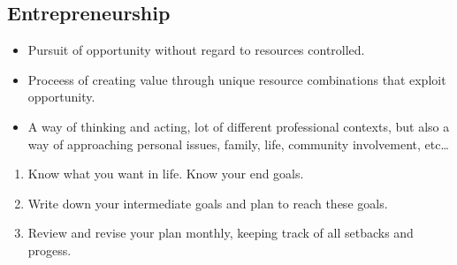 \subsection{Entrepreneurship}

\begin{definition}[Entrepreneurship]

    \begin{itemize}
        \item Pursuit of opportunity without regard to resources controlled.
        \item Proceess of creating value through unique resource combinations
            that exploit opportunity.
        \item A way of thinking and acting, lot of different professional
            contexts, but also a way of approaching personal issues, family,
            life, community involvement, etc\dots
    \end{itemize}
\end{definition}

\begin{definition}[Success]
    
    \begin{enumerate}
        \item Know what you want in life. Know your end goals.
        \item Write down your intermediate goals and plan to reach these goals.
        \item Review and revise your plan monthly, keeping track of all setbacks
            and progess.
    \end{enumerate}
\end{definition}

